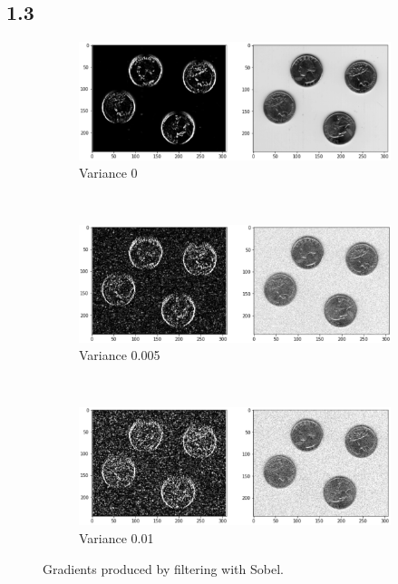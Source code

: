 \subsection*{1.3}
\begin{figure}[H]
	\centering
	\begin{subfigure}[b]{\textwidth}
		\centering
		\includegraphics[width=\textwidth]{Materials/svar0}
		\caption{Variance 0}
	\end{subfigure}
	\hfill
	\\
	\begin{subfigure}[b]{\textwidth}
		\centering
		\includegraphics[width=\textwidth]{Materials/svar005}
		\caption{Variance 0.005}
	\end{subfigure}
	\hfill
	\\
	\begin{subfigure}[b]{\textwidth}
		\centering
		\includegraphics[width=\textwidth]{Materials/svar01}
		\caption{Variance 0.01}
	\end{subfigure}
	\caption{Gradients produced by filtering with Sobel.}
	\label{sobel1}
\end{figure}
